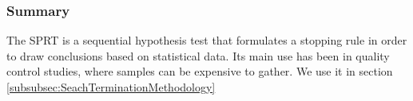 \subsubsection{Summary}
The SPRT is a sequential hypothesis test that formulates a stopping rule in order to draw conclusions based on statistical data. Its main use has been in quality control studies, where samples can be expensive to gather. We use it in section \ref{subsubsec:SeachTerminationMethodology}